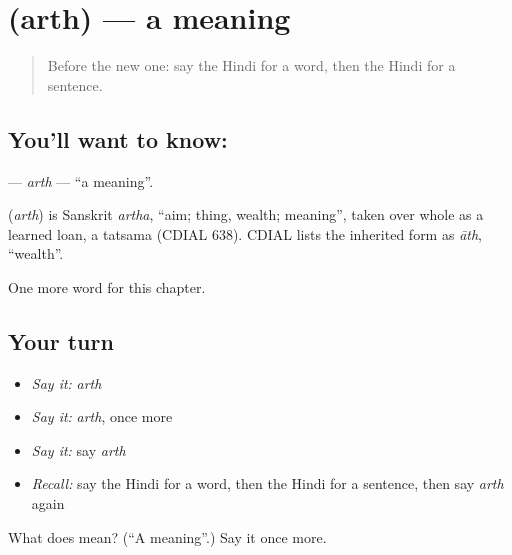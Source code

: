 \section[\texorpdfstring{\hi{अर्थ} (arth)}{अर्थ (arth)}]{ (arth) — a meaning}

\label{lesson:HI-C198-arth}



\begin{quote}
Before the new one: say the Hindi for a word, then the Hindi for a sentence.
\end{quote}

\subsection*{You'll want to know: }
\textbf{} — \emph{arth} — \textquotedblleft{}a meaning\textquotedblright{}.

\begin{cousinweb}
\textbf{} (\emph{arth}) is Sanskrit \emph{artha}, \textquotedblleft{}aim; thing, wealth; meaning\textquotedblright{}, taken over whole as a learned loan, a tatsama (CDIAL 638). CDIAL lists the inherited form as \emph{āth}, \textquotedblleft{}wealth\textquotedblright{}.
\end{cousinweb}

\begin{grammarlens}[title={What you've built}]
One more word for this chapter.
\end{grammarlens}

\subsection*{Your turn}
\begin{itemize}
\raggedright
  \item \emph{Say it:} \emph{arth}
  \item \emph{Say it:} \emph{arth}, once more
  \item \emph{Say it:} say \emph{arth}
  \item \emph{Recall:} say the Hindi for a word, then the Hindi for a sentence, then say \emph{arth} again
\end{itemize}

\begin{tcolorbox}[breakable,colback=teal!4,colframe=teal!35!black,title={Before you move on}]
What does  mean? (\textquotedblleft{}A meaning\textquotedblright{}.) Say it once more.
\end{tcolorbox}
